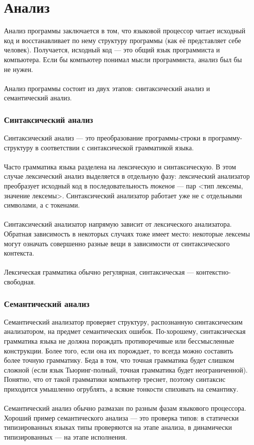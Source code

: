 \documentclass[11pt]{book}
\begin{document}
\section{Анализ}
Анализ программы заключается в том, что языковой процессор читает исходный код
и восстанавливает по нему структуру программы (как её представляет себе человек).
Получается, исходный код --- это общий язык программиста и компьютера.
Если бы компьютер понимал мысли программиста, анализ был бы не нужен.
\\ \\
Анализ программы состоит из двух этапов: синтаксический анализ и семантический анализ.

\subsubsection{Синтаксический анализ}
Синтаксический анализ --- это преобразование программы-строки в программу-структуру в соответствии с синтаксической грамматикой языка.
\\ \\
Часто грамматика языка разделена на лексическую и синтаксическую.
В этом случае лексический анализ выделяется в отдельную фазу:
лексический анализатор преобразует исходный код в последовательность \emph{токенов} --- пар <тип лексемы, значение лексемы>.
Синтаксический анализатор работает уже не с отдельными символами, а с токенами.
\\ \\
Синтаксический анализатор напрямую зависит от лексического анализатора.
Обратная зависимость в некоторых случаях тоже имеет место:
некоторые лексемы могут означать совершенно разные вещи в зависимости от синтаксического контекста.
\\ \\
Лексическая грамматика обычно регулярная, синтаксическая --- контекстно-свободная.

\subsubsection{Семантический анализ}
Семантический анализатор проверяет структуру, распознанную синтаксическим анализатором, на предмет семантических ошибок.
По-хорошему, синтаксическая грамматика языка не должна порождать противоречивые или бессмысленные конструкции.
Более того, если она их порождает, то всегда можно составить более точную грамматику.
Беда в том, что точная грамматика будет слишком сложной (если язык Тьюринг-полный, точная грамматика будет неограниченной).
Понятно, что от такой грамматики компьютер треснет,
поэтому синтаксис приходится умышленно огрублять, а всякие тонкости спихивать на семантику.
\\ \\
Семантический анализ обычно размазан по разным фазам языкового процессора.
Хороший пример семантического анализа --- это проверка типов:
в статически типизированных языках типы проверяются на этапе анализа,
в динамически типизированных --- на этапе исполнения.
\end{document}
